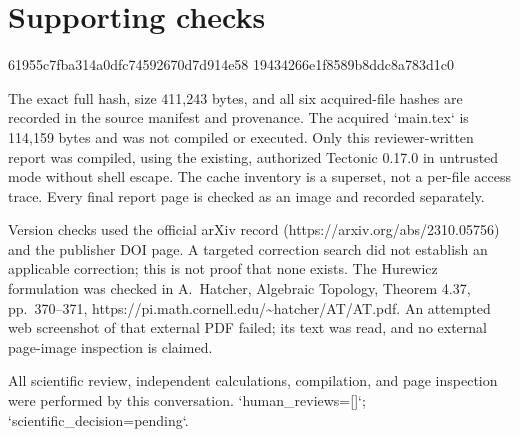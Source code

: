 \documentclass[10pt]{article}
\begin{document}
\section*{Supporting checks}
61955c7fba314a0dfc74592670d7d914e58
19434266e1f8589b8ddc8a783d1c0\par
The exact full hash, size 411,243 bytes, and all six acquired-file hashes are recorded in the source manifest and provenance. The acquired `main.tex` is 114,159 bytes and was not compiled or executed. Only this reviewer-written report was compiled, using the existing, authorized Tectonic 0.17.0 in untrusted mode without shell escape. The cache inventory is a superset, not a per-file access trace. Every final report page is checked as an image and recorded separately.\par
Version checks used the official arXiv record (https://arxiv.org/abs/2310.05756) and the publisher DOI page. A targeted correction search did not establish an applicable correction; this is not proof that none exists. The Hurewicz formulation was checked in A. Hatcher, Algebraic Topology, Theorem 4.37, pp. 370–371, https://pi.math.cornell.edu/\textasciitilde{}hatcher/AT/AT.pdf. An attempted web screenshot of that external PDF failed; its text was read, and no external page-image inspection is claimed.\par
All scientific review, independent calculations, compilation, and page inspection were performed by this conversation. `human\_reviews=[]`; `scientific\_decision=pending`.\par
\end{document}
